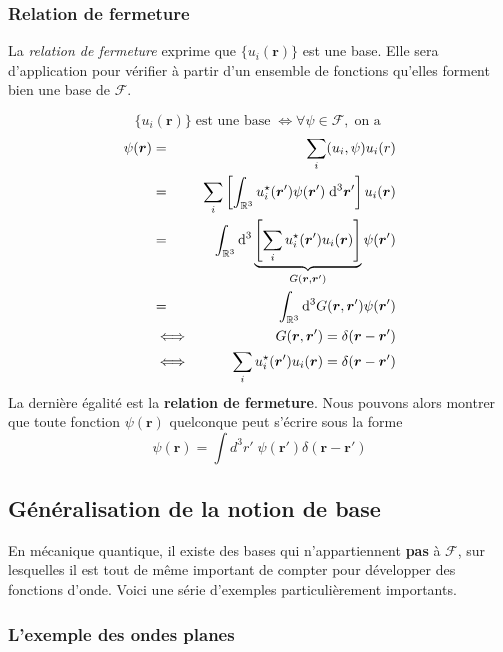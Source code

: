 \documentclass[../notesdecours.tex]{subfiles}
\begin{document}
\subsubsection{Relation de fermeture}
La \textit{relation de fermeture} exprime que $\{u_i(\bm{r})\}$ est une base. Elle sera d'application pour vérifier à partir d'un ensemble de fonctions qu'elles forment bien une base de $\mathcal F$.

$$\{u_i(\bm{r})\} \; \text{est une base} \; \iff \forall \psi \in \mathcal F, \;\text{on a }$$
\begin{eqnarray}
\psi(\bm{r}) &=& \sum_i (u_i, \psi) u_i(r) \\
&=& \sum_i \left[\int_{\mathbb R ^3} u_i ^\star(\bm{r}') \psi(\bm{r}') \; \mathrm{d} ^3 \bm{r}'\right] u_i(\bm{r}) \\
&=& \int_{\mathbb R ^3}\mathrm{d} ^3  \underbrace{\left[\sum_iu_i ^\star(\bm{r}')u_i(\bm{r}) \right]}_{G(\bm{r}, \bm{r}')}\psi(\bm{r}') \\
&=& \int_{\mathbb R ^3}\mathrm{d} ^3 G(\bm{r}, \bm{r}')\psi(\bm{r}') \\
&\iff& G(\bm{r}, \bm{r}') = \delta(\bm{r}-\bm{r}') \\
&\iff& \sum_iu_i ^\star(\bm{r}')u_i(\bm{r}) = \delta(\bm{r}-\bm{r}') 
\end{eqnarray}
La dernière égalité est la \textbf{relation de fermeture}. Nous pouvons alors montrer que toute fonction $\psi(\bm{r})$ quelconque peut s'écrire sous la forme
\begin{equation}
\psi(\bm{r}) = \int d^3r' \; \psi(\bm{r}') \delta (\bm{r} - \bm{r}')
\label{implication relation de fermeture}
\end{equation}
\subsection{Généralisation de la notion de base}
En mécanique quantique, il existe des bases qui n'appartiennent \textbf{pas} à $\mathcal F$, sur lesquelles il est tout de même important de compter pour développer des fonctions d'onde. Voici une série d'exemples particulièrement importants.
\subsubsection{L'exemple des ondes planes}
\end{document}
